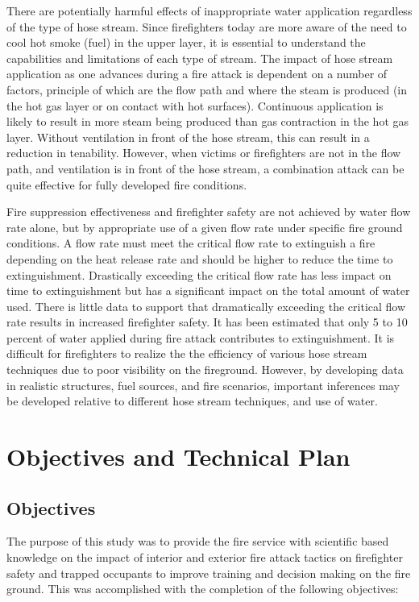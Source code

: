 \documentclass{article}
\begin{document}
There are potentially harmful effects of inappropriate water application regardless of the type of hose stream. Since firefighters today are more aware of the need to cool hot smoke (fuel) in the upper layer, it is essential to understand the capabilities and limitations of each type of stream. The impact of hose stream application as one advances during a fire attack is dependent on a number of factors, principle of which are the flow path and where the steam is produced (in the hot gas layer or on contact with hot surfaces). Continuous application is likely to result in more steam being produced than gas contraction in the hot gas layer. Without ventilation in front of the hose stream, this can result in a reduction in tenability. However, when victims or firefighters are not in the flow path, and ventilation is in front of the hose stream, a combination attack can be quite effective for fully developed fire conditions.

Fire suppression effectiveness and firefighter safety are not achieved by water flow rate alone, but by appropriate use of a given flow rate under specific fire ground conditions. A flow rate must meet the critical flow rate to extinguish a fire depending on the heat release rate and should be higher to reduce the time to extinguishment. Drastically exceeding the critical flow rate has less impact on time to extinguishment but has a significant impact on the total amount of water used. There is little data to support that dramatically exceeding the critical flow rate results in increased firefighter safety. It has been estimated that only 5 to 10 percent of water applied during fire attack contributes to extinguishment. It is difficult for firefighters to realize the the efficiency of various hose stream techniques due to poor visibility on the fireground. However, by developing data in realistic structures, fuel sources, and fire scenarios, important inferences may be developed relative to different hose stream techniques, and use of water.

\clearpage

\section{Objectives and Technical Plan}

\subsection {Objectives}

The purpose of this study was to provide the fire service with scientific based knowledge on the impact of interior and exterior fire attack tactics on firefighter safety and trapped occupants to improve training and decision making on the fire ground. This was accomplished with the completion of the following objectives:
\end{document}
